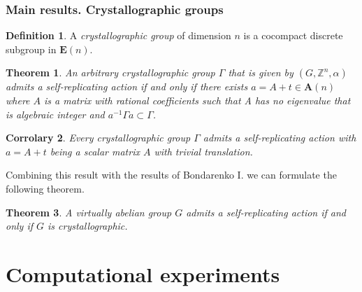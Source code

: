 \documentclass[notheorems,handout,san serif,hyperref={unicode}]{beamer} %
\newtheorem{theorem}{Theorem}[section]
\newtheorem{corollary}[theorem]{Corrolary}
\theoremstyle{definition}
\newtheorem{definition}{Definition}[section]
\begin{document}
\begin{frame}
	\frametitle{Main results. Crystallographic groups}
	\begin{definition}
		A \textit{crystallographic group} of dimension $n$ is a cocompact discrete subgroup in $\mathbf{E}(n)$.
	\end{definition}
	
	
	\begin{theorem} \label{theorem: cryst criterion}
		An arbitrary crystallographic group $\Gamma$ that is given by $(G, \mathbb{Z}^n, \alpha)$ admits a self-replicating action if and only if 
		there exists $a = A + t \in \mathbf{A}(n)$ where $A$ is a matrix with rational coefficients such that A has no eigenvalue that is algebraic integer and  $a^{-1} \Gamma a \subset \Gamma$. 
	\end{theorem}
	
	\vskip 0.5cm
		
	\begin{corollary} \label{cor: self-replicating action for cryst}
		Every crystallographic group $\Gamma$ admits a self-replicating action with $a=A+t$ being a scalar matrix $A$ with trivial translation.  
	\end{corollary}
	
	\vskip 0.5cm
	
	
	Combining this result with the results of Bondarenko I. we can formulate the following theorem.
	\begin{theorem}
		A virtually abelian group $G$ admits a self-replicating action if and only if $G$ is crystallographic.
	\end{theorem}
	
	
\end{frame}


\section{Computational experiments}
\end{document}
